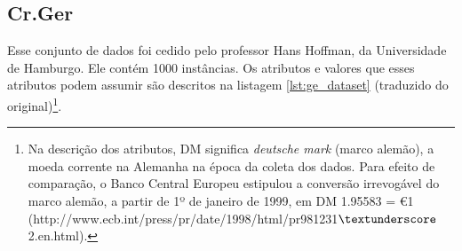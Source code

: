 \subsection{Cr.Ger}

Esse conjunto de dados foi cedido pelo professor Hans Hoffman, da Universidade de Hamburgo. Ele contém 1000 instâncias. Os atributos e valores que esses atributos podem assumir são descritos na listagem \ref{lst:ge_dataset} (traduzido do original)\footnote{Na descrição dos atributos, DM significa \emph{deutsche mark} (marco alemão), a moeda corrente na Alemanha na época da coleta dos dados. Para efeito de comparação, o Banco Central Europeu estipulou a conversão irrevogável do marco alemão, a partir de 1º de janeiro de 1999, em DM 1.95583 = \euro 1 (http://www.ecb.int/press/pr/date/1998/html/pr981231$\textunderscore$2.en.html).}.

